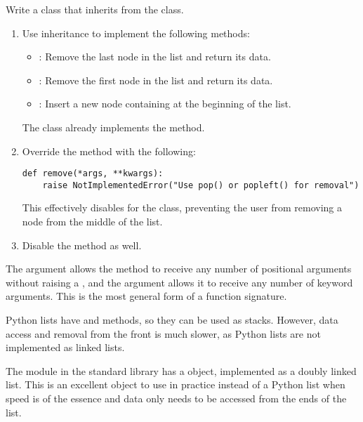 \begin{problem} %
Write a  class that inherits from the  class.
%
\begin{enumerate}
\item Use inheritance to implement the following methods:
%
\begin{itemize}
    \item {}: Remove the last node in the list and return its data.
    \item {}: Remove the first node in the list and return its data.
    \item {}: Insert a new node containing  at the beginning of the list.
\end{itemize}
The  class already implements the  method.

\item Override the  method with the following:

\begin{lstlisting}
def remove(*args, **kwargs):
    raise NotImplementedError("Use pop() or popleft() for removal")
\end{lstlisting}

This effectively disables  for the  class, preventing the user from removing a node from the middle of the list.

\item Disable the  method as well.
\end{enumerate}
\end{problem}

\newpage

\begin{info}
The  argument allows the  method to receive any number of positional arguments without raising a , and the  argument allows it to receive any number of keyword arguments.
This is the most general form of a function signature.
\end{info}

Python lists have  and  methods, so they can be used as stacks.
However, data access and removal from the front is much slower, as Python lists are not implemented as linked lists.

The  module in the standard library has a  object, implemented as a doubly linked list.
This is an excellent object to use in practice instead of a Python list when speed is of the essence and data only needs to be accessed from the ends of the list.

